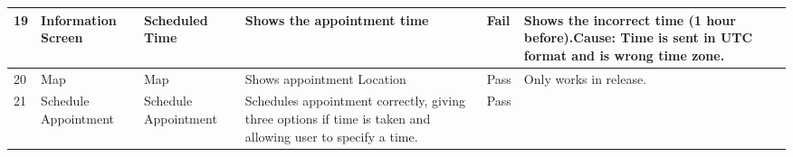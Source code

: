 \begin{table}[h]
{\begin{tabular}{|m{1cm}|m{3cm}|m{4cm}|m{6cm}|m{2cm}|m{6cm}|}
19      & Information Screen            & Scheduled Time               & Shows the appointment time                                                                                                & Fail        & Shows the incorrect time (1 hour before).Cause: Time is sent in UTC format and is wrong time zone.                                                         \\ \hline
20      & Map                           & Map                          & Shows appointment Location                                                                                                & Pass        & Only works in release.                                                                                                                                     \\ \hline
21      & Schedule Appointment          & Schedule Appointment         & Schedules appointment correctly, giving three options if time is taken and allowing user to specify a time.               & Pass        &                                                                                                                                                            \\ \hline
\end{tabular}
}
\end{table}